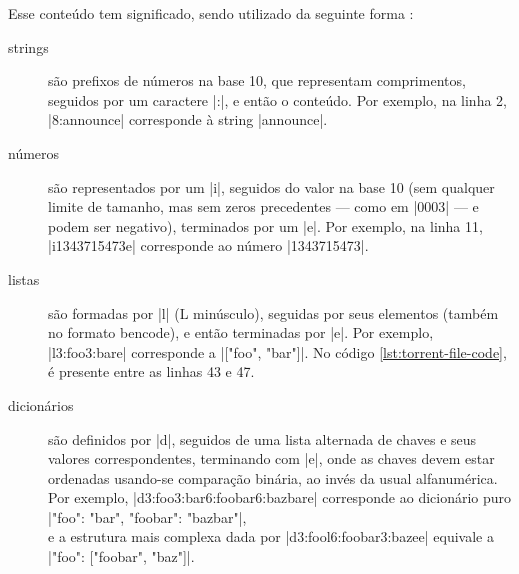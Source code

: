 Esse conteúdo tem significado, sendo utilizado da seguinte forma
\cite{wikitheory:bencoding}:

\begin{description}
    \item[\glspl*{string}] são prefixos de números na base 10, que representam
        comprimentos, seguidos por um caractere \bverb|:|, e então o conteúdo. Por
        exemplo, na linha 2, \bverb|8:announce| corresponde à \gls*{string}
        \sverb|announce|.

    \item[números] são representados por um \bverb|i|, seguidos do valor na
        base 10 (sem qualquer limite de tamanho, mas sem zeros precedentes --- como em
        \bverb|0003| --- e podem ser negativo), terminados por um \bverb|e|. Por
        exemplo, na linha 11, \bverb|i1343715473e| corresponde ao número
        \sverb|1343715473|.

    \item[listas] são formadas por \bverb|l| (L minúsculo), seguidas por seus elementos
        (também no formato \gls*{bencode}), e então terminadas por \bverb|e|. Por
        exemplo, \bverb|l3:foo3:bare| corresponde a \sverb|["foo", "bar"]|. No código
        \ref{lst:torrent-file-code}, é presente entre as linhas 43 e 47.

    \item[dicionários] são definidos por \bverb|d|, seguidos de uma lista
        alternada de chaves e seus valores correspondentes, terminando com \bverb|e|,
        onde as chaves devem estar ordenadas usando-se comparação binária, ao invés da
        usual alfanumérica. Por exemplo,
        \bverb|d3:foo3:bar6:foobar6:bazbare| corresponde ao dicionário puro
        \sverb|{"foo": "bar", "foobar": "bazbar"}|, \\
        e a estrutura mais complexa dada por \bverb|d3:fool6:foobar3:bazee|
        equivale a \\\sverb|{"foo": ["foobar", "baz"]}|.
\end{description}

